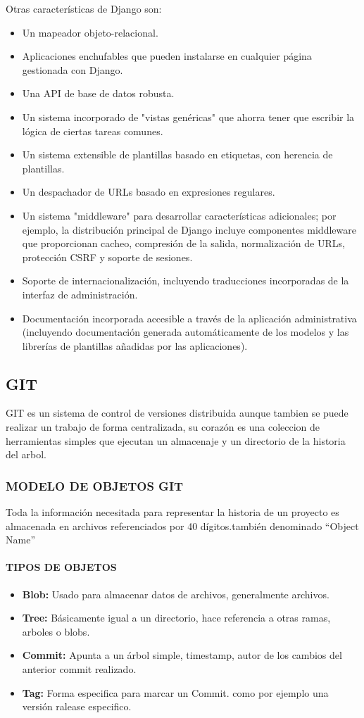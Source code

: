 Otras características de Django son:
\begin{itemize}

\item Un mapeador objeto-relacional.
\item Aplicaciones enchufables que pueden instalarse en cualquier página gestionada con Django.
\item Una API de base de datos robusta.
\item Un sistema incorporado de "vistas genéricas" que ahorra tener que escribir la lógica de ciertas tareas comunes.
\item Un sistema extensible de plantillas basado en etiquetas, con herencia de plantillas.
\item Un despachador de URLs basado en expresiones regulares.
\item Un sistema "middleware" para desarrollar características adicionales; por ejemplo, la distribución principal de Django incluye componentes middleware que proporcionan cacheo, compresión de la salida, normalización de URLs, protección CSRF y soporte de sesiones.
\item Soporte de internacionalización, incluyendo traducciones incorporadas de la interfaz de administración.
\item Documentación incorporada accesible a través de la aplicación administrativa (incluyendo documentación generada automáticamente de los modelos y las librerías de plantillas añadidas por las aplicaciones).

\end{itemize}


\subsection{GIT}
GIT es un sistema de control de versiones distribuida aunque tambien se puede realizar un trabajo de forma centralizada, su corazón es una coleccion de herramientas simples que ejecutan un almacenaje y un directorio de la historia del arbol.
\subsubsection{MODELO DE OBJETOS GIT}
Toda la información necesitada para representar la historia de un proyecto es almacenada en archivos referenciados por 40 dígitos.también denominado ``Object Name''
\paragraph{TIPOS DE OBJETOS}
\begin{itemize}
 \item \textbf{Blob: } Usado para almacenar datos de archivos, generalmente archivos.
 \item \textbf{Tree: } Básicamente igual a un directorio, hace referencia a otras ramas, arboles o blobs.
 \item \textbf{Commit: } Apunta a un árbol simple, timestamp, autor de los cambios del anterior commit realizado.
 \item \textbf{Tag: } Forma especifica para marcar un Commit. como por ejemplo una versión ralease especifico.
\end{itemize}

